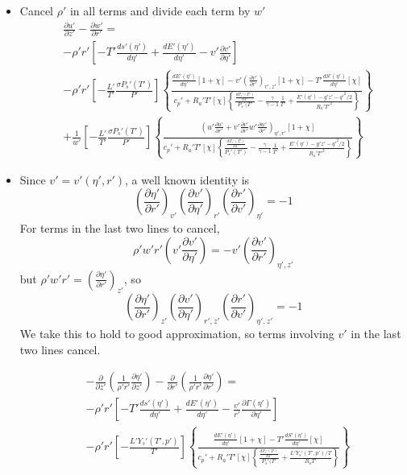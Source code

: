 \documentclass[preprint, prX]{revtex4}
\newcommand{\gogmo}{\frac{\gamma}{\gamma-1}}
\newcommand{\dd}[2]{\frac{d#1}{d#2}}
\newcommand{\pd}[2]{\frac{\partial#1}{\partial#2}}
\newcommand{\tpd}[3]{\left( \frac{\partial#1}{\partial#2} \right)_{#3}}
\begin{document}
\begin{itemize}
\item 
Cancel $\rho'$ in all terms and divide each term by $w'$
\begin{equation}
\begin{split}
&\pd{u'}{z'} - \pd{w'}{r'} = \\
&-\rho'r'\left[ -T' \dd{s'(\eta')}{\eta'} +\dd{E'(\eta')}{\eta'}- v' \pd{v'}{\eta'} \right] \\
& - \rho' r' \left[ -\frac{L'}{T'}\frac{\sigma P_s'(T')}{P'} \right] \left\{ \frac{\dd{E'(\eta')}{\eta'}\left[ 1+\chi\right] - v'\tpd{v'}{r'}{r',z'}\left[ 1 + \chi \right] - T' \dd{S'(\eta')}{\eta'}[\chi]}{c_p'+R_a'T'[\chi] \left\{ \frac{\dd{P_s'(T')}{T'}}{P_s'(T'} -\gogmo \frac{1}{T'} + \frac{E'(\eta') - g'z' - q'^2/2}{R_a'T'^2} \right\} }\right\} \\
&+ \frac{1}{w'} \left[ -\frac{L'}{T'}\frac{\sigma P_s'(T')}{P'} \right] \left\{ \frac{ \left( u'\pd{u'}{r'} +v'\pd{v'}{r'} w'\pd{w'}{r'} \right)_{\eta',r'} [1+\chi] }{c_p' + R_a'T'[\chi] \left\{ \frac{\dd{P_s'(T')}{T'}}{P_s'(T')} -\gogmo \frac{1}{T'} + \frac{E'(\eta') - g'z' - q'^2/2}{R_a'T'^2} \right \} }	\right\}
\end{split}
\end{equation}
\item
Since $v' = v'(\eta',r')$, a well known identity is
\begin{equation}
\tpd{\eta'}{r'}{v'}\tpd{v'}{\eta'}{r'}\tpd{r'}{v'}{\eta'} = -1
\end{equation}
For terms in the last two lines to cancel,
\begin{equation}
\rho'w'r'\left(v'\pd{v'}{\eta'} \right) = -v'\tpd{v'}{r'}{\eta',z'}
\end{equation}
but $\rho'w'r' = \tpd{\eta'}{r'}{z'}$, so
\begin{equation}
\tpd{\eta'}{r'}{z'}\tpd{v'}{\eta'}{r',z'}\tpd{r'}{v'}{\eta',z'} = -1
\end{equation}
We take this to hold to good approximation, so terms involving $v'$ in the last two lines cancel.

\begin{equation}
\begin{split}
&-\pd{}{z'}\left( \frac{1}{\rho' r'} \pd{\eta'}{z'}\right) - \pd{}{r'}\left(\frac{1}{\rho'r'} \pd{\eta'}{r'}\right) =\\
&-\rho'r'\left[ -T' \dd{s'(\eta')}{\eta'} +\dd{E'(\eta')}{\eta'}- \frac{v'}{r'} \pd{\Gamma(\eta')}{\eta'} \right] \\
& - \rho' r' \left[ -\frac{L'Y_s'(T',p')}{T'} \right] \left\{ \frac{\dd{E'(\eta')}{\eta'}\left[ 1+\chi\right]  - T' \dd{S'(\eta')}{\eta'}[\chi]}{c_p'+R_a'T'[\chi] \left\{ \frac{\dd{P_s'(T')}{T'}}{P_s'(T'} +\frac{L'Y_s'(T',p')/T}{R_a T'} \right\} }\right\} \\
\end{split}
\end{equation}


\end{itemize}
\end{document}
